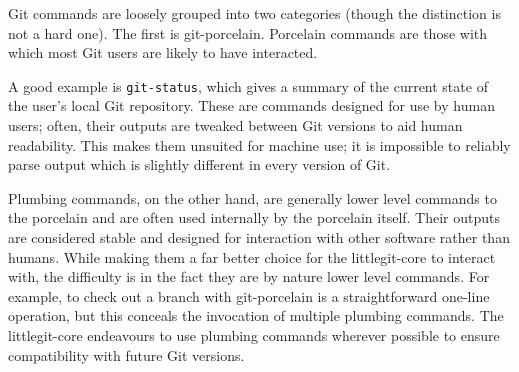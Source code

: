 Git commands are loosely grouped into two categories (though the distinction is not a hard one). The first is git-porcelain. Porcelain commands are those with which most Git users are likely to have interacted.

A good example is \texttt{git-status}, which gives a summary of the current state of the user's local Git repository. These are commands designed for use by human users; often, their outputs are tweaked between Git versions to aid human readability. This makes them unsuited for machine use; it is impossible to reliably parse output which is slightly different in every version of Git.

Plumbing commands, on the other hand, are generally lower level commands to the porcelain and are often used internally by the porcelain itself. Their outputs are considered stable and designed for interaction with other software rather than humans. While making them a far better choice for the littlegit-core to interact with, the difficulty is in the fact they are by nature lower level commands. For example, to check out a branch with git-porcelain is a straightforward one-line operation, but this conceals the invocation of multiple plumbing commands. The littlegit-core endeavours to use plumbing commands wherever possible to ensure compatibility with future Git versions.
